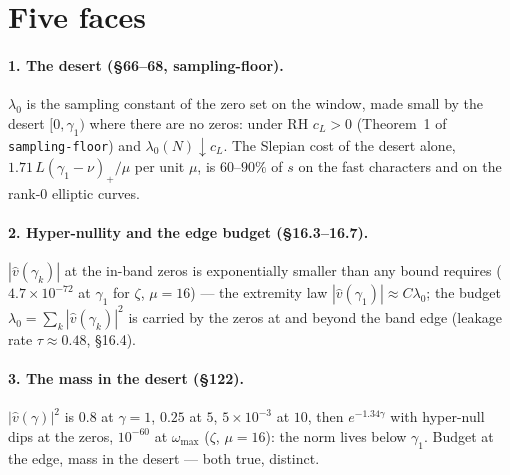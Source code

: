 \documentclass[11pt]{article}
\begin{document}
\section{Five faces}
\paragraph{1. The desert (\S66--68, sampling-floor).} $\lambda_0$ is the sampling constant of the zero set on the window, made small by the desert $[0,\gamma_1)$ where there are no zeros: under RH $c_L>0$ (Theorem~1 of \texttt{sampling-floor}) and $\lambda_0(N)\downarrow c_L$. The Slepian cost of the desert alone, $1.71\,L(\gamma_1-\nu)_+/\mu$ per unit $\mu$, is $60$--$90\%$ of $s$ on the fast characters and on the rank-$0$ elliptic curves.

\paragraph{2. Hyper-nullity and the edge budget (\S16.3--16.7).} $|\hat v(\gamma_k)|$ at the in-band zeros is exponentially smaller than any bound requires ($4.7\times10^{-72}$ at $\gamma_1$ for $\zeta$, $\mu=16$) --- the extremity law $|\hat v(\gamma_1)|\approx C\lambda_0$; the budget $\lambda_0=\sum_k|\hat v(\gamma_k)|^2$ is carried by the zeros at and beyond the band edge (leakage rate $\tau\approx0.48$, \S16.4).

\paragraph{3. The mass in the desert (\S122).} $|\hat v(\gamma)|^2$ is $0.8$ at $\gamma=1$, $0.25$ at $5$, $5\times10^{-3}$ at $10$, then $e^{-1.34\gamma}$ with hyper-null dips at the zeros, $10^{-60}$ at $\omega_{\max}$ ($\zeta$, $\mu=16$): the norm lives below $\gamma_1$. Budget at the edge, mass in the desert --- both true, distinct.
\end{document}
